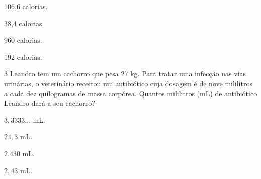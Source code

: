 \begin{multicols}{2}
\begin{escolha}[itemsep=0pt]
\item 106,6 calorias.
\item 38,4 calorias.
\item 960 calorias.
\item 192 calorias.
\end{escolha}
\end{multicols}











\num{3} Leandro tem um cachorro que pesa $27$ kg. Para
tratar uma infecção nas vias urinárias, o veterinário receitou um
antibiótico cuja dosagem é de nove mililitros a cada dez quilogramas de massa corpórea.
Quantos mililitros (mL) de antibiótico Leandro dará a seu cachorro?

\begin{multicols}{2}
\begin{escolha}[itemsep=0pt]
\item $3,3333\ldots$ mL.
\item $24,3$ mL.
\item $2.430$ mL.
\item $2,43$ mL.
\end{escolha}
\end{multicols}

